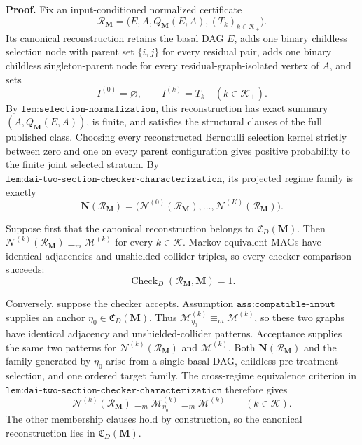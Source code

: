 \textbf{Proof.}
Fix an input-conditioned normalized certificate
\[
\mathcal R_{\mathbf M}
=\bigl(E,A,Q_{\mathbf M}(E,A),(T_k)_{k\in\mathcal K_+}\bigr).
\]
Its canonical reconstruction retains the basal DAG \(E\), adds one binary childless selection node with parent set \(\{i,j\}\) for every residual pair, adds one binary childless singleton-parent node for every residual-graph-isolated vertex of \(A\), and sets
\[
I^{(0)}=\varnothing,
\qquad
I^{(k)}=T_k\quad(k\in\mathcal K_+).
\]
By \(\texttt{lem:selection-normalization}\), this reconstruction has exact summary \((A,Q_{\mathbf M}(E,A))\), is finite, and satisfies the structural clauses of the full published class.  Choosing every reconstructed Bernoulli selection kernel strictly between zero and one on every parent configuration gives positive probability to the finite joint selected stratum.  By \(\texttt{lem:dai-two-section-checker-characterization}\), its projected regime family is exactly
\[
\mathbf N(\mathcal R_{\mathbf M})
=\bigl(\mathcal N^{(0)}(\mathcal R_{\mathbf M}),\ldots,
\mathcal N^{(K)}(\mathcal R_{\mathbf M})\bigr).
\]

Suppose first that the canonical reconstruction belongs to \(\mathfrak C_D(\mathbf M)\).  Then \(\mathcal N^{(k)}(\mathcal R_{\mathbf M})\equiv_m\mathcal M^{(k)}\) for every \(k\in\mathcal K\).  Markov-equivalent MAGs have identical adjacencies and unshielded collider triples, so every checker comparison succeeds:
\[
\operatorname{Check}_{D}(\mathcal R_{\mathbf M},\mathbf M)=1.
\]

Conversely, suppose the checker accepts.  Assumption \(\texttt{ass:compatible-input}\) supplies an anchor \(\eta_0\in\mathfrak C_D(\mathbf M)\).  Thus \(\mathcal M_{\eta_0}^{(k)}\equiv_m\mathcal M^{(k)}\), so these two graphs have identical adjacency and unshielded-collider patterns.  Acceptance supplies the same two patterns for \(\mathcal N^{(k)}(\mathcal R_{\mathbf M})\) and \(\mathcal M^{(k)}\).  Both \(\mathbf N(\mathcal R_{\mathbf M})\) and the family generated by \(\eta_0\) arise from a single basal DAG, childless pre-treatment selection, and one ordered target family.  The cross-regime equivalence criterion in \(\texttt{lem:dai-two-section-checker-characterization}\) therefore gives
\[
\mathcal N^{(k)}(\mathcal R_{\mathbf M})
\equiv_m\mathcal M_{\eta_0}^{(k)}
\equiv_m\mathcal M^{(k)}
\qquad(k\in\mathcal K).
\]
The other membership clauses hold by construction, so the canonical reconstruction lies in \(\mathfrak C_D(\mathbf M)\).

